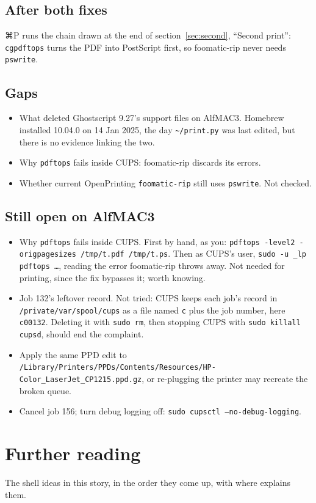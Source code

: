 \documentclass[11pt,a4paper]{article}
\newcommand{\furtherlist}{}
\begin{document}
\subsection*{After both fixes}

⌘P runs the chain drawn at the end of section~\ref{sec:second}, ``Second print'': \texttt{cgpdftops} turns the PDF into PostScript first, so foomatic-rip never needs \texttt{pswrite}.

\subsection*{Gaps}
\begin{itemize}[nosep]
  \item What deleted Ghostscript 9.27's support files on AlfMAC3. Homebrew installed 10.04.0 on 14 Jan 2025, the day \texttt{\textasciitilde/print.py} was last edited, but there is no evidence linking the two.
  \item Why \texttt{pdftops} fails inside CUPS: foomatic-rip discards its errors.
  \item Whether current OpenPrinting \texttt{foomatic-rip} still uses \texttt{pswrite}. Not checked.
\end{itemize}

\subsection*{Still open on AlfMAC3}\label{sec:open}
\begin{itemize}[nosep]
  \item Why \texttt{pdftops} fails inside CUPS. First by hand, as you: \texttt{pdftops -level2 -origpagesizes /tmp/t.pdf /tmp/t.ps}. Then as CUPS's user, \texttt{sudo -u \_lp pdftops \dots}, reading the error foomatic-rip throws away. Not needed for printing, since the fix bypasses it; worth knowing.
  \item Job 132's leftover record. Not tried: CUPS keeps each job's record in \nolinkurl{/private/var/spool/cups} as a file named \texttt{c} plus the job number, here \texttt{c00132}. Deleting it with \texttt{sudo rm}, then stopping CUPS with \texttt{sudo killall cupsd}, should end the complaint.
  \item Apply the same PPD edit to \nolinkurl{/Library/Printers/PPDs/Contents/Resources/HP-Color_LaserJet_CP1215.ppd.gz}, or re-plugging the printer may recreate the broken queue.
  \item Cancel job 156; turn debug logging off: \texttt{sudo cupsctl --no-debug-logging}.\end{itemize}

\section*{Further reading}

The shell ideas in this story, in the order they come up, with where \cite{shotts} explains them.

\begin{itemize}[nosep]
\furtherlist
\end{itemize}

\printbibliography

\revisiontable
\end{document}
